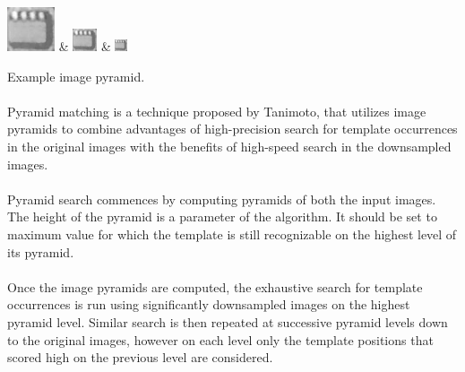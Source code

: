 \begin{table}[h!]
	\centering
	\includegraphics[width=.25\textwidth]{TemplateMatching/img/board_template_pyramid_0} &
	\includegraphics[width=.25\textwidth]{TemplateMatching/img/board_template_pyramid_1} &
	\includegraphics[width=.25\textwidth]{TemplateMatching/img/board_template_pyramid_2}	

	\endtabular
	\caption{Example image pyramid.}
	\label{fig:TemplatePyramid}
\end{table}

\paragraph*{}
Pyramid matching is a technique proposed\cite{Tanimoto81} by Tanimoto, that utilizes image pyramids to combine advantages of high-precision search for template occurrences in the original images with the benefits of high-speed search in the downsampled images. 

\paragraph*{}
Pyramid search commences by computing pyramids of both the input images. The height of the pyramid is a parameter of the algorithm. It should be set to maximum value for which the template is still recognizable on the highest level of its pyramid.

\paragraph*{}
Once the image pyramids are computed, the exhaustive search for template occurrences is run using significantly downsampled images on the highest pyramid level. Similar search is then repeated at successive pyramid levels down to the original images, however on each level only the template positions that scored high on the previous level are considered.

